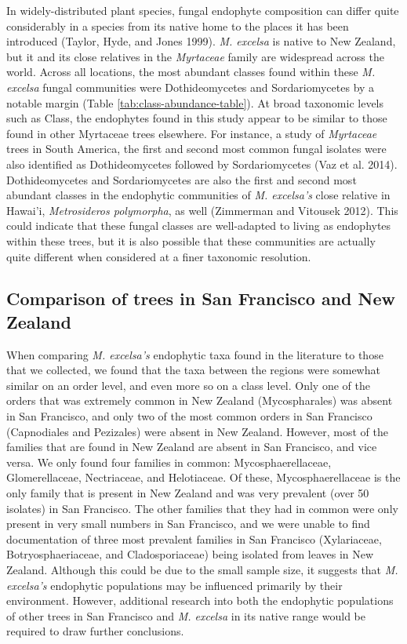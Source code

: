 \documentclass[fleqn,10pt,lineno]{wlpeerj} %
\begin{document}
In widely-distributed plant species, fungal endophyte composition can differ quite considerably in a species from its native home to the places it has been introduced (Taylor, Hyde, and Jones 1999). \emph{M. excelsa} is native to New Zealand, but it and its close relatives in the \emph{Myrtaceae} family are widespread across the world. Across all locations, the most abundant classes found within these \emph{M. excelsa} fungal communities were Dothideomycetes and Sordariomycetes by a notable margin (Table \ref{tab:class-abundance-table}). At broad taxonomic levels such as Class, the endophytes found in this study appear to be similar to those found in other Myrtaceae trees elsewhere. For instance, a study of \emph{Myrtaceae} trees in South America, the first and second most common fungal isolates were also identified as Dothideomycetes followed by Sordariomycetes (Vaz et al. 2014). Dothideomycetes and Sordariomycetes are also the first and second most abundant classes in the endophytic communities of \emph{M. excelsa's} close relative in Hawai'i, \emph{Metrosideros polymorpha}, as well (Zimmerman and Vitousek 2012). This could indicate that these fungal classes are well-adapted to living as endophytes within these trees, but it is also possible that these communities are actually quite different when considered at a finer taxonomic resolution.

\hypertarget{comparison-of-trees-in-san-francisco-and-new-zealand}{%
\subsection*{Comparison of trees in San Francisco and New Zealand}\label{comparison-of-trees-in-san-francisco-and-new-zealand}}

When comparing \emph{M. excelsa's} endophytic taxa found in the literature to those that we collected, we found that the taxa between the regions were somewhat similar on an order level, and even more so on a class level. Only one of the orders that was extremely common in New Zealand (Mycospharales) was absent in San Francisco, and only two of the most common orders in San Francisco (Capnodiales and Pezizales) were absent in New Zealand. However, most of the families that are found in New Zealand are absent in San Francisco, and vice versa. We only found four families in common: Mycosphaerellaceae, Glomerellaceae, Nectriaceae, and Helotiaceae. Of these, Mycosphaerellaceae is the only family that is present in New Zealand and was very prevalent (over 50 isolates) in San Francisco. The other families that they had in common were only present in very small numbers in San Francisco, and we were unable to find documentation of three most prevalent families in San Francisco (Xylariaceae, Botryosphaeriaceae, and Cladosporiaceae) being isolated from leaves in New Zealand. Although this could be due to the small sample size, it suggests that \emph{M. excelsa's} endophytic populations may be influenced primarily by their environment. However, additional research into both the endophytic populations of other trees in San Francisco and \emph{M. excelsa} in its native range would be required to draw further conclusions.
\end{document}
